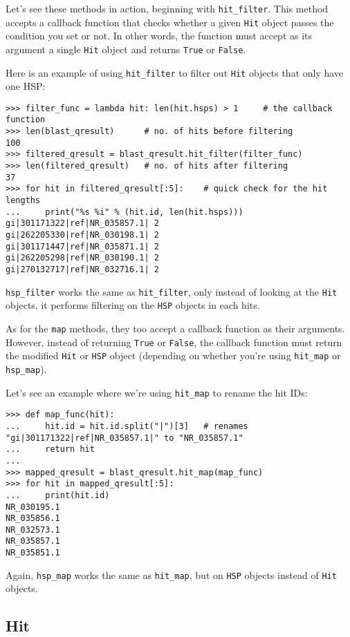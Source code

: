 Let's see these methods in action, beginning with \verb|hit_filter|. This method
accepts a callback function that checks whether a given \verb|Hit| object passes
the condition you set or not. In other words, the function must accept as its
argument a single \verb|Hit| object and returns \verb|True| or \verb|False|.

Here is an example of using \verb|hit_filter| to filter out \verb|Hit| objects
that only have one HSP:

\begin{verbatim}
>>> filter_func = lambda hit: len(hit.hsps) > 1     # the callback function
>>> len(blast_qresult)      # no. of hits before filtering
100
>>> filtered_qresult = blast_qresult.hit_filter(filter_func)
>>> len(filtered_qresult)   # no. of hits after filtering
37
>>> for hit in filtered_qresult[:5]:    # quick check for the hit lengths
...     print("%s %i" % (hit.id, len(hit.hsps)))
gi|301171322|ref|NR_035857.1| 2
gi|262205330|ref|NR_030198.1| 2
gi|301171447|ref|NR_035871.1| 2
gi|262205298|ref|NR_030190.1| 2
gi|270132717|ref|NR_032716.1| 2
\end{verbatim}

\verb|hsp_filter| works the same as \verb|hit_filter|, only instead of looking
at the \verb|Hit| objects, it performs filtering on the \verb|HSP| objects in
each hits.

As for the \verb|map| methods, they too accept a callback function as their
arguments. However, instead of returning \verb|True| or \verb|False|, the
callback function must return the modified \verb|Hit| or \verb|HSP| object
(depending on whether you're using \verb|hit_map| or \verb|hsp_map|).

Let's see an example where we're using \verb|hit_map| to rename the hit IDs:

\begin{verbatim}
>>> def map_func(hit):
...     hit.id = hit.id.split("|")[3]   # renames "gi|301171322|ref|NR_035857.1|" to "NR_035857.1"
...     return hit
...
>>> mapped_qresult = blast_qresult.hit_map(map_func)
>>> for hit in mapped_qresult[:5]:
...     print(hit.id)
NR_030195.1
NR_035856.1
NR_032573.1
NR_035857.1
NR_035851.1
\end{verbatim}

Again, \verb|hsp_map| works the same as \verb|hit_map|, but on \verb|HSP|
objects instead of \verb|Hit| objects.

\subsection{Hit}
\label{sec:searchio-hit}

